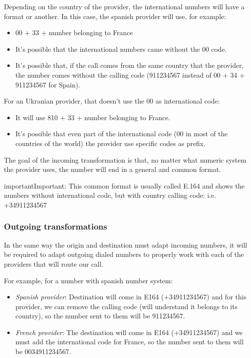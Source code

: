 \documentclass[letterpaper,10pt,english]{sphinxmanual}
\begin{document}
Depending on the country of the provider, the international numbers will have
a format or another. In this case, the spanish provider will use, for example:
\begin{itemize}
\item {} 
00 + 33 + number belonging to France

\item {} 
It's possible that the international numbers came without the 00 code.

\item {} 
It's possible that, if the call comes from the same country that the provider,
the number comes without the calling code (911234567 instead of 00 + 34 +
911234567 for Spain).

\end{itemize}

For an Ukranian provider, that doesn't use the 00 as international code:
\begin{itemize}
\item {} 
It will use 810 + 33 + number belonging to France.

\item {} 
It's possible that even part of the international code (00 in most of the
countries of the world) the provider use specific codes as prefix.

\end{itemize}

The goal of the incoming transformation is that, no matter what numeric system
the provider uses, the number will end in a general and common format.
\label{administration_portal/brand/settings/numeric_transformations:e164}
\begin{notice}{important}{Important:}
This common format is usually called E.164 and shows the numbers
without international code, but with country calling code: i.e. +34911234567
\end{notice}


\subsubsection{Outgoing transformations}
\label{administration_portal/brand/settings/numeric_transformations:outgoing-transformations}
In the same way the origin and destination must adapt incoming numbers, it
will be required to adapt outgoing dialed numbers to properly work with each
of the providers that will route our call.

For example, for a number with spanish number system:
\begin{itemize}
\item {} 
\emph{Spanish provider}: Destination will come in E164 (+34911234567) and for this
provider, we can remove the calling code (will understand it belongs to
its country), so the number sent to them will be 911234567.

\item {} 
\emph{French provider}: The destination will come in E164 (+34911234567) and we must
add the international code for France, so the number sent to them will be
0034911234567.

\end{itemize}
\end{document}
